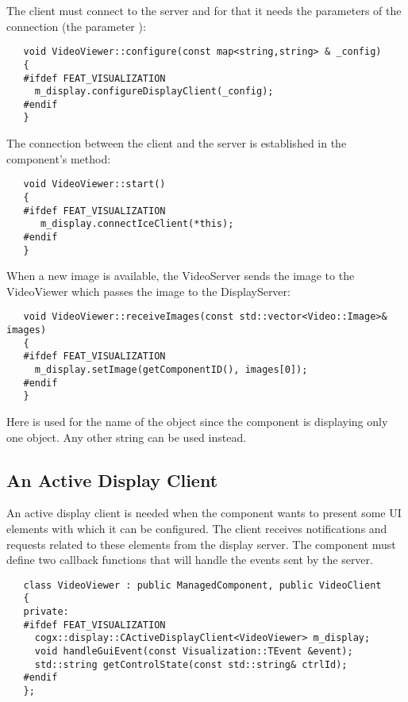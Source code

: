 The client must connect to the server and for that it needs the parameters of the
connection (the parameter ):

\begin{verbatim}
   void VideoViewer::configure(const map<string,string> & _config)
   {
   #ifdef FEAT_VISUALIZATION
     m_display.configureDisplayClient(_config);
   #endif
   }
\end{verbatim}

The connection between the client and the server is established in the component's
 method:
\begin{verbatim}
   void VideoViewer::start()
   {
   #ifdef FEAT_VISUALIZATION
      m_display.connectIceClient(*this);
   #endif
   }
\end{verbatim}

When a new image is available, the VideoServer sends the image to the VideoViewer which
passes the image to the DisplayServer:

\begin{verbatim}
   void VideoViewer::receiveImages(const std::vector<Video::Image>& images)
   {
   #ifdef FEAT_VISUALIZATION
     m_display.setImage(getComponentID(), images[0]);
   #endif
   }
\end{verbatim}

Here  is used for the name of the object since the component
is displaying only one object. Any other string can be used instead.


\subsection{An Active Display Client}

An active display client is needed when the component wants to present some UI
elements with which it can be configured. The client receives notifications and
requests related to these elements from the display server. The component must
define two callback functions that will handle the events sent by the server.

\begin{verbatim}
   class VideoViewer : public ManagedComponent, public VideoClient
   {
   private:
   #ifdef FEAT_VISUALIZATION
     cogx::display::CActiveDisplayClient<VideoViewer> m_display;
     void handleGuiEvent(const Visualization::TEvent &event);
     std::string getControlState(const std::string& ctrlId);
   #endif
   };
\end{verbatim}

